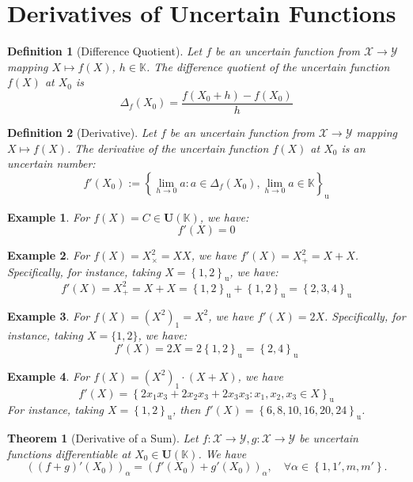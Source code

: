 \documentclass[a4paper,12pt,twoside]{memoir}
\newtheorem{definition}{Definition}[chapter]
\newtheorem{theorem}{Theorem}[chapter]
\newtheorem{example}{Example}[chapter]
\newcommand{\set}[1]{\left\{#1\right\}} %
\newcommand{\s}[1]{\set{#1}_\mathrm{u}} %
\newcommand{\tsbd}[1]{\mathbf{U}(\mathbb{#1})}
\begin{document}
	\section{Derivatives of Uncertain Functions}
	
	\begin{definition}[Difference Quotient]
		Let $f$ be an uncertain function from $\mathcal{X} \rightarrow \mathcal{Y}$ mapping $X \mapsto f(X)$, $h \in \mathbb{K}$.
		The difference quotient of the uncertain function $f(X)$ at $X_0$ is
		\[\Delta_f(X_0)= \frac{f(X_0 + h) - f(X_0)}{h}\]
	\end{definition}
	
	\begin{definition}[Derivative]
		Let $f$ be an uncertain function from $\mathcal{X} \rightarrow \mathcal{Y}$ mapping $X \mapsto f(X)$.
		The derivative of the uncertain function $f(X)$ at $X_0$ is an uncertain number:
		$$f'(X_0) := \s{\lim_{h\rightarrow 0}{a: a \in \Delta_f(X_0) , \lim_{h\rightarrow 0}a \in \mathbb{K}}}$$
	\end{definition}
	
	\begin{example}
		For $f(X) = C \in \tsbd{K}$, we have: $$f'(X) = 0$$
	\end{example}
	
	\begin{example}
		For $f(X) = X^2_\times = XX $, we have $f'(X) = X^2_+ = X+X$. Specifically, for instance, taking $X = \s{1,2}$, we have:
		$$f'(X) = X^2_+ = X+X = \s{1,2} + \s{1,2} = \s{2,3,4}$$
	\end{example}
	
	\begin{example}
		For $f(X) = (X^2)_1 = X^2 $, we have $f'(X) = 2X$. Specifically, for instance, taking $X = \{1,2\}$, we have:
		$$f'(X) = 2X = 2 \s{1,2} = \s{2,4}$$
	\end{example}
	
	\begin{example}
		For $f(X)= (X^2)_1\cdot (X+X)$, we have
		\[f'(X) = \s{2x_1x_3+2x_2x_3+2x_3x_3 : x_1,x_2,x_3 \in X}\]
		For instance, taking $X=\s{1,2}$, then $f'(X) = \s{6, 8, 10, 16, 20, 24}$.
	\end{example}
	
	\begin{theorem}[Derivative of a Sum]
		Let $f : \mathcal{X} \to \mathcal{Y}, g : \mathcal{X} \to \mathcal{Y}$ be uncertain functions differentiable at $X_0 \in \tsbd{K}$. We have
		\[
		((f+g)'(X_0))_\alpha = (f'(X_0) + g'(X_0))_\alpha, \quad \forall \alpha \in \set{1,1', m,m'}.
		\]
	\end{theorem}
	
\end{document}
